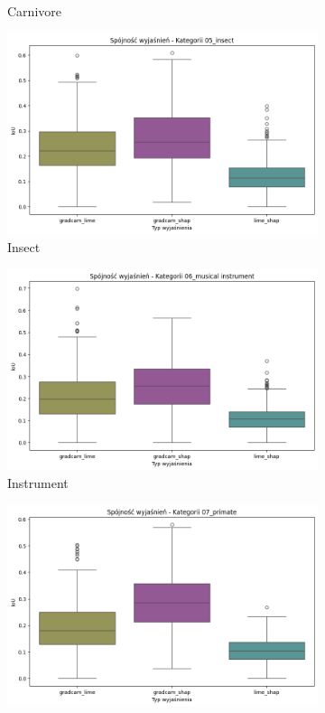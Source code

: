\begin{figure}
\begin{subfigure}[b]{0.3\textwidth}
		\caption{Carnivore}  \label{}
	\end{subfigure}
	\begin{subfigure}[b]{0.3\textwidth}
		\centering\includegraphics[width=.9\textwidth]{img/base_coherence_insect}
		\caption{Insect}  \label{}
	\end{subfigure}
	\begin{subfigure}[b]{0.3\textwidth}
		\centering\includegraphics[width=.9\textwidth]{img/base_coherence_music}
		\caption{Instrument}  \label{}
	\end{subfigure}
	\begin{subfigure}[b]{0.3\textwidth}
		\centering\includegraphics[width=.9\textwidth]{img/base_coherence_primate}

\end{subfigure}
\end{figure}
